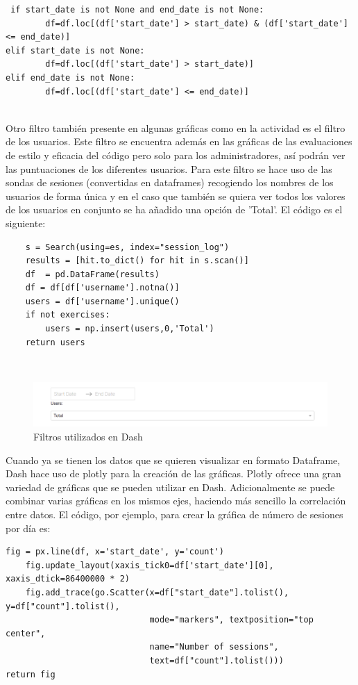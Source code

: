 {\footnotesize
\begin{verbatim}
 if start_date is not None and end_date is not None:
        df=df.loc[(df['start_date'] > start_date) & (df['start_date'] <= end_date)]
elif start_date is not None:
        df=df.loc[(df['start_date'] > start_date)]
elif end_date is not None:
        df=df.loc[(df['start_date'] <= end_date)]
\end{verbatim}
}
\\

Otro filtro también presente en algunas gráficas como en la actividad es el filtro de los usuarios. Este filtro se encuentra además en las gráficas de las evaluaciones de estilo y eficacia del código pero solo para los administradores, así podrán ver las puntuaciones de los diferentes usuarios. Para este filtro se hace uso de las sondas de sesiones (convertidas en dataframes) recogiendo los nombres de los usuarios de forma única y en el caso que también se quiera ver todos los valores de los usuarios en conjunto se ha añadido una opción de 'Total'. El código es el siguiente:
\newpage
{\footnotesize
\begin{verbatim}
	s = Search(using=es, index="session_log")
    results = [hit.to_dict() for hit in s.scan()]
    df  = pd.DataFrame(results)
    df = df[df['username'].notna()]
    users = df['username'].unique()
    if not exercises:
        users = np.insert(users,0,'Total')
    return users
\end{verbatim}
}
\\
\begin{figure}[H]
    \centering
    \includegraphics[width=16cm, keepaspectratio]{img/filtros.png}
    \caption{Filtros utilizados en Dash}
    \label{fig:filtros}
\end{figure}

Cuando ya se tienen los datos que se quieren visualizar en formato Dataframe, Dash hace uso de plotly para la creación de las gráficas. Plotly ofrece una gran variedad de gráficas que se pueden utilizar en Dash. Adicionalmente se puede combinar varias gráficas en los mismos ejes, haciendo más sencillo la correlación entre datos. El código, por ejemplo, para crear la gráfica de número de sesiones por día es:\\
{\footnotesize
\begin{verbatim}
fig = px.line(df, x='start_date', y='count')
    fig.update_layout(xaxis_tick0=df['start_date'][0], xaxis_dtick=86400000 * 2)
    fig.add_trace(go.Scatter(x=df["start_date"].tolist(), y=df["count"].tolist(),
                             mode="markers", textposition="top center", 
                             name="Number of sessions",
                             text=df["count"].tolist()))
return fig
\end{verbatim}
}
\\
\newpage


